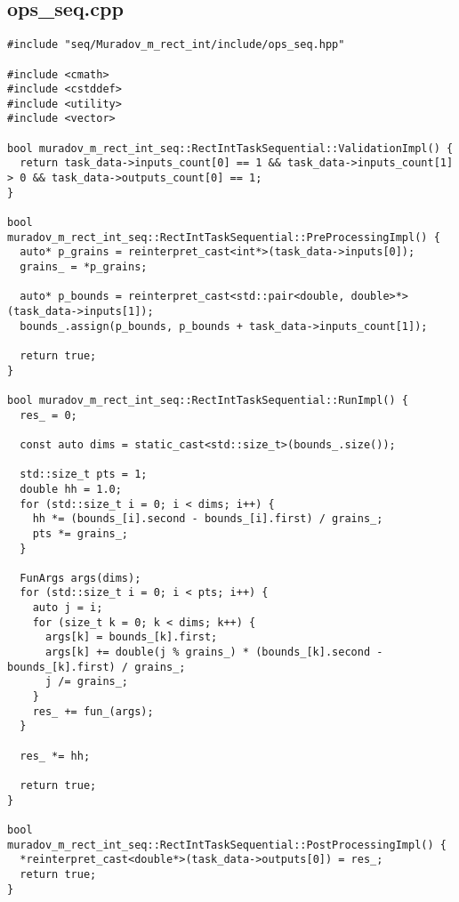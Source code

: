 \documentclass[12pt,a4paper]{extarticle}
\begin{document}
\subsection{ops\_seq.cpp}
\begin{lstlisting}
#include "seq/Muradov_m_rect_int/include/ops_seq.hpp"

#include <cmath>
#include <cstddef>
#include <utility>
#include <vector>

bool muradov_m_rect_int_seq::RectIntTaskSequential::ValidationImpl() {
  return task_data->inputs_count[0] == 1 && task_data->inputs_count[1] > 0 && task_data->outputs_count[0] == 1;
}

bool muradov_m_rect_int_seq::RectIntTaskSequential::PreProcessingImpl() {
  auto* p_grains = reinterpret_cast<int*>(task_data->inputs[0]);
  grains_ = *p_grains;

  auto* p_bounds = reinterpret_cast<std::pair<double, double>*>(task_data->inputs[1]);
  bounds_.assign(p_bounds, p_bounds + task_data->inputs_count[1]);

  return true;
}

bool muradov_m_rect_int_seq::RectIntTaskSequential::RunImpl() {
  res_ = 0;

  const auto dims = static_cast<std::size_t>(bounds_.size());

  std::size_t pts = 1;
  double hh = 1.0;
  for (std::size_t i = 0; i < dims; i++) {
    hh *= (bounds_[i].second - bounds_[i].first) / grains_;
    pts *= grains_;
  }

  FunArgs args(dims);
  for (std::size_t i = 0; i < pts; i++) {
    auto j = i;
    for (size_t k = 0; k < dims; k++) {
      args[k] = bounds_[k].first;
      args[k] += double(j % grains_) * (bounds_[k].second - bounds_[k].first) / grains_;
      j /= grains_;
    }
    res_ += fun_(args);
  }

  res_ *= hh;

  return true;
}

bool muradov_m_rect_int_seq::RectIntTaskSequential::PostProcessingImpl() {
  *reinterpret_cast<double*>(task_data->outputs[0]) = res_;
  return true;
}
\end{lstlisting}
\end{document}

